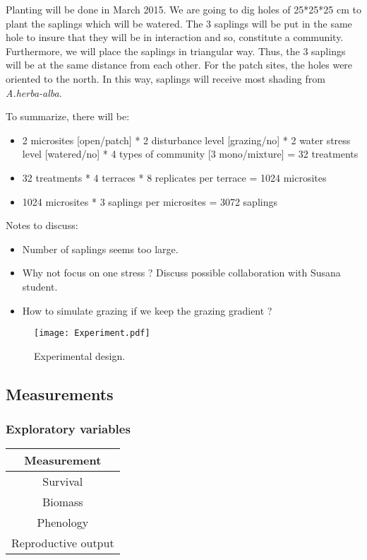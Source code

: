 \documentclass[12pt, a4paper]{article} %
\begin{document}
Planting will be done in March 2015. We are going to dig holes of 25*25*25 cm to plant the saplings which will be watered. The 3 saplings will be put in the same hole to insure that they will be in interaction and so, constitute a community. Furthermore, we will place the saplings in triangular way. Thus, the 3 saplings will be at the same distance from each other. For the patch sites, the holes were oriented to the north. In this way, saplings will receive most shading from \textit{A.herba-alba}.


To summarize, there will be:
\begin{itemize} %
\item 2 microsites [open/patch] * 2 disturbance level [grazing/no] * 2 water stress level [watered/no] * 4 types of community [3 mono/mixture] = 32 treatments
\item 32 treatments * 4 terraces * 8 replicates per terrace = 1024 microsites
\item 1024 microsites * 3 saplings per microsites = 3072 saplings 
\end{itemize}

Notes to discuss:
\begin{itemize}
	\item Number of saplings seems too large.
	\item Why not focus on one stress ? Discuss possible collaboration with Susana student.
	\item How to simulate grazing if we keep the grazing gradient ?
\end{itemize}

\begin{figure} %
\begin{center}
\texttt{[image: Experiment.pdf]}
\end{center}
\caption{Experimental design.\label{exp}}
\end{figure}

\subsection{Measurements}
\subsubsection{Exploratory variables}
\begin{table}[h]
\begin{center}
\begin{tabular}{c}
Measurement \\ 
\hline
Survival \\ 
Biomass \\ 
Phenology \\ 
Reproductive output \\
\hline 
\end{tabular}
\end{center}
\end{table} 
\end{document}
